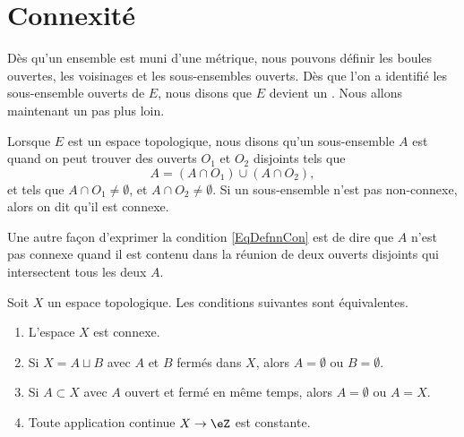 \section{Connexité}

Dès qu'un ensemble est muni d'une métrique, nous pouvons définir les boules ouvertes, les voisinages et les sous-ensembles ouverts. Dès que l'on a identifié les sous-ensemble ouverts de $E$, nous disons que $E$ devient un . Nous allons maintenant un pas plus loin.

\begin{definition}  \label{DefIRKNooJJlmiD}
     Lorsque $E$ est un espace topologique, nous disons qu'un sous-ensemble $A$ est  quand on peut trouver des ouverts $O_1$ et $O_2$ disjoints tels que
    \begin{equation}    \label{EqDefnnCon}
        A=(A\cap O_1)\cup (A\cap O_2),
    \end{equation}
    et tels que $A\cap O_1\neq\emptyset$, et $A\cap O_2\neq\emptyset$. Si un sous-ensemble n'est pas non-connexe, alors on dit qu'il est connexe.
\end{definition}
Une autre façon d'exprimer la condition \eqref{EqDefnnCon} est de dire que $A$ n'est pas connexe quand il est contenu dans la réunion de deux ouverts disjoints qui intersectent tous les deux $A$.

\begin{proposition} \label{PropHSjJcIr}
    Soit \( X\) un espace topologique. Les conditions suivantes sont équivalentes.
    \begin{enumerate}
        \item
            L'espace \( X\) est connexe.
        \item
            Si \( X=A\sqcup B\) avec \( A\) et \( B\) fermés dans \( X\), alors \( A=\emptyset\) ou \( B=\emptyset\).
        \item
            Si \( A\subset X\) avec \( A\) ouvert et fermé en même temps, alors \( A=\emptyset\) ou \( A=X\).
        \item
            Toute application continue \( X\to \eZ\) est constante.
    \end{enumerate}
\end{proposition}

